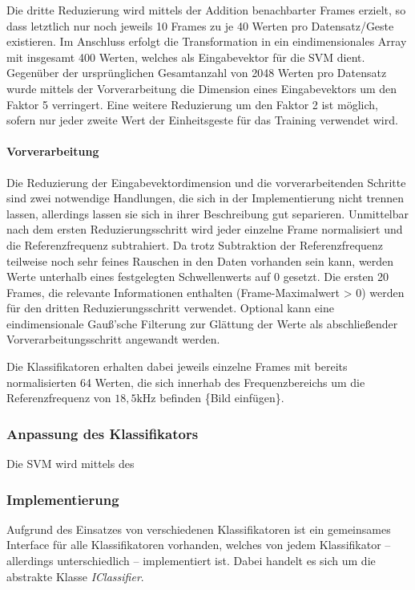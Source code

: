 Die dritte Reduzierung wird mittels der Addition benachbarter Frames erzielt, so dass letztlich nur noch jeweils 10 Frames zu je 40 Werten pro Datensatz/Geste existieren.
Im Anschluss erfolgt die Transformation in ein eindimensionales Array mit insgesamt 400 Werten, welches als Eingabevektor für die \ac{SVM} dient.
Gegenüber der ursprünglichen Gesamtanzahl von 2048 Werten pro Datensatz wurde mittels der Vorverarbeitung die Dimension eines Eingabevektors um den Faktor 5 verringert.
Eine weitere Reduzierung um den Faktor 2 ist möglich, sofern nur jeder zweite Wert der Einheitsgeste für das Training verwendet wird.

\paragraph{Vorverarbeitung}\label{sec:svm_preprocess} 
Die Reduzierung der Eingabevektordimension und die vorverarbeitenden Schritte sind zwei notwendige Handlungen, die sich in der Implementierung nicht trennen lassen, allerdings lassen sie sich in ihrer Beschreibung gut separieren.
Unmittelbar nach dem ersten Reduzierungsschritt wird jeder einzelne Frame normalisiert und die Referenzfrequenz subtrahiert.
Da trotz Subtraktion der Referenzfrequenz teilweise noch sehr feines Rauschen in den Daten vorhanden sein kann, werden Werte unterhalb eines festgelegten Schwellenwerts auf 0 gesetzt.
Die ersten 20 Frames, die relevante Informationen enthalten (Frame-Maximalwert > 0) werden für den dritten Reduzierungsschritt verwendet.
Optional kann eine eindimensionale Gauß'sche Filterung zur Glättung der Werte als abschließender Vorverarbeitungsschritt angewandt werden.



Die Klassifikatoren erhalten dabei jeweils einzelne Frames mit bereits normalisierten 64 Werten, die sich innerhab des Frequenzbereichs um die Referenzfrequenz von $18,5\text{kHz}$ befinden  \{Bild einfügen\}. 


\subsubsection{Anpassung des Klassifikators}
Die \ac{SVM} wird mittels des 


\subsubsection{Implementierung}
Aufgrund des Einsatzes von verschiedenen Klassifikatoren ist ein gemeinsames Interface für alle Klassifikatoren vorhanden, welches von jedem Klassifikator -- allerdings unterschiedlich -- implementiert ist. 
Dabei handelt es sich um die abstrakte Klasse \textit{IClassifier}.

